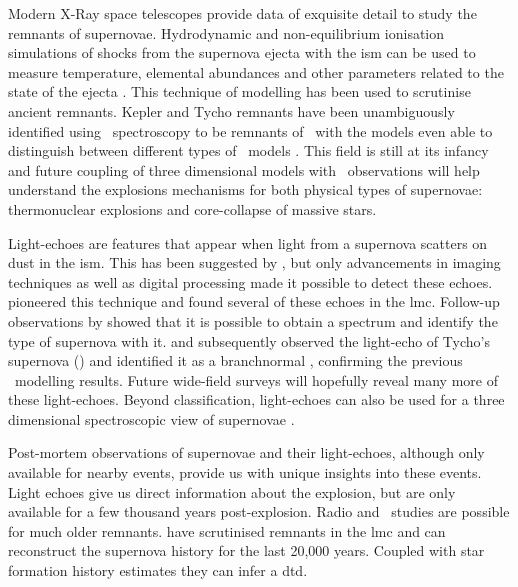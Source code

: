 Modern X-Ray space telescopes provide data of exquisite detail to study the remnants of supernovae. Hydrodynamic and non-equilibrium ionisation simulations of shocks from the supernova ejecta with the \gls{ism} can be used to measure temperature, elemental abundances and other parameters related to the state of the ejecta \citep{2003ApJ...593..358B, 2004AstL...30..737S, 2005ApJ...624..198B}. This technique of modelling has been used to scrutinise ancient remnants. Kepler and Tycho remnants have been unambiguously identified using \xray~spectroscopy to be remnants of \sneia\  with the models even able to distinguish between different types of \snia\ models \citep{2006ApJ...645.1373B, 2007ApJ...668L.135R}. This field is still at its infancy and future coupling of three dimensional models with \xray\ observations will help understand the explosions mechanisms for both physical types of supernovae: thermonuclear explosions and core-collapse of massive stars. 

Light-echoes are features that appear when light from a supernova scatters on dust in the \gls{ism}. This has been suggested by \citet{1940RvMP...12...66Z}, but only advancements in imaging techniques as well as digital processing made it possible to detect these echoes. \cite{2005Natur.438.1132R} pioneered this technique and found several of these echoes in the \gls{lmc}. Follow-up observations by \cite{2008ApJ...680.1137R} showed that it is possible to obtain a spectrum and identify the type of supernova with it. 
\citet{2008Natur.456..617K} and \citet{2008ApJ...681L..81R} subsequently observed the light-echo of Tycho's supernova () and identified it as a \gls{branchnormal} \snia, confirming the previous \xray\ modelling results. Future wide-field surveys will hopefully reveal many more of these light-echoes. Beyond classification, light-echoes can also be used for a three dimensional spectroscopic view of supernovae \citep[demonstrated on the example of the  remnant; see][]{2011ApJ...732....3R}.

Post-mortem observations of supernovae and their light-echoes, although only available for nearby events, provide us with unique insights into these events.  Light echoes give us direct information about the explosion, but are only available for a few thousand years post-explosion. Radio and \xray\ studies are possible for much older remnants.  \citet{2010MNRAS.407.1314M} have scrutinised remnants in the \gls{lmc} and can reconstruct the supernova history for the last 20,000 years. Coupled with star formation history estimates they can infer a \gls{dtd}.

